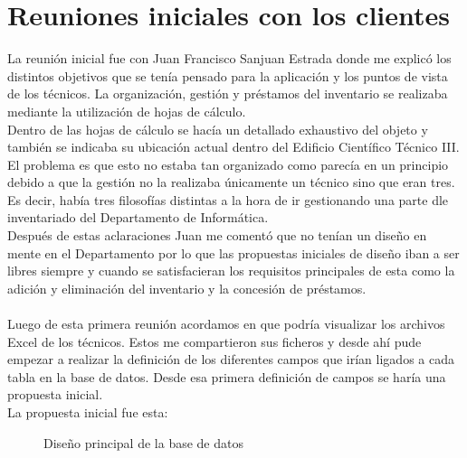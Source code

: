 \section{Reuniones iniciales con los clientes}

La reunión inicial fue con Juan Francisco Sanjuan Estrada donde me explicó los distintos objetivos que se tenía pensado para la aplicación y los puntos de vista de los técnicos. La organización, gestión y préstamos del inventario se realizaba mediante la utilización de hojas de cálculo.
\\Dentro de las hojas de cálculo se hacía un detallado exhaustivo del objeto y también se indicaba su ubicación actual dentro del Edificio Científico Técnico III.
\\El problema es que esto no estaba tan organizado como parecía en un principio debido a que la gestión no la realizaba únicamente un técnico sino que eran tres. Es decir, había tres filosofías distintas a la hora de ir gestionando una parte dle inventariado del Departamento de Informática.
\\Después de estas aclaraciones Juan me comentó que no tenían un diseño en mente en el Departamento por lo que las propuestas iniciales de diseño iban a ser libres siempre y cuando se satisfacieran los requisitos principales de esta como la adición y eliminación del inventario y la concesión de préstamos.
\\\\Luego de esta primera reunión acordamos en que podría visualizar los archivos Excel de los técnicos. Estos me compartieron sus ficheros y desde ahí pude empezar a realizar la definición de los diferentes campos que irían ligados a cada tabla en la base de datos. Desde esa primera definición de campos se haría una propuesta inicial.
\\La propuesta inicial fue esta:

\begin{figure}
    \caption{Diseño principal de la base de datos}
\end{figure}

